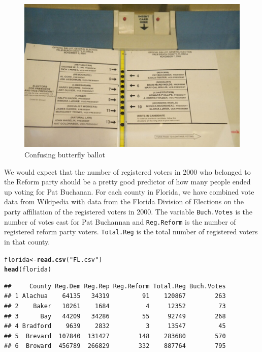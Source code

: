 \documentclass{article}\usepackage[]{graphicx}\usepackage[]{color}
\makeatletter
\newcommand{\hlstr}[1]{\textcolor[rgb]{0.192,0.494,0.8}{#1}}%
\newcommand{\hlstd}[1]{\textcolor[rgb]{0.345,0.345,0.345}{#1}}%
\newcommand{\hlkwb}[1]{\textcolor[rgb]{0.69,0.353,0.396}{#1}}%
\newcommand{\hlkwd}[1]{\textcolor[rgb]{0.737,0.353,0.396}{\textbf{#1}}}%
\newenvironment{kframe}{%
 \def\at@end@of@kframe{}%
 \ifinner\ifhmode%
  \def\at@end@of@kframe{\end{minipage}}%
  \begin{minipage}{\columnwidth}%
 \fi\fi%
 \def\FrameCommand##1{\hskip\@totalleftmargin \hskip-\fboxsep
 \colorbox{shadecolor}{##1}\hskip-\fboxsep
     \hskip-\linewidth \hskip-\@totalleftmargin \hskip\columnwidth}%
 \MakeFramed {\advance\hsize-\width
   \@totalleftmargin\z@ \linewidth\hsize
   \@setminipage}}%
 {\par\unskip\endMakeFramed%
 \at@end@of@kframe}
\newenvironment{knitrout}{}{} %
\makeatother
\begin{document}
\begin{figure}[h]
\centering
\includegraphics[scale = .3]{butterfly}
\caption{Confusing butterfly ballot}
\end{figure}

\FloatBarrier

We would expect that the number of registered voters in 2000 who belonged to the Reform party should be a pretty good predictor of how many people ended up voting for Pat Buchanan. For each county in Florida, we have combined vote data from Wikipedia with data from the Florida Division of Elections on the party affiliation of the registered voters in 2000. The variable \texttt{Buch.Votes} is the number of votes cast for Pat Buchannan and \texttt{Reg.Reform} is the number of registered reform party voters. \texttt{Total.Reg} is the total number of registered voters in that county. 

\begin{knitrout}
\color{fgcolor}\begin{kframe}
\begin{alltt}
\hlstd{florida} \hlkwb{<-} \hlkwd{read.csv}\hlstd{(}\hlstr{"FL.csv"}\hlstd{)}
\hlkwd{head}\hlstd{(florida)}
\end{alltt}
\begin{verbatim}
##     County Reg.Dem Reg.Rep Reg.Reform Total.Reg Buch.Votes
## 1 Alachua    64135   34319         91    120867        263
## 2    Baker   10261    1684          4     12352         73
## 3      Bay   44209   34286         55     92749        268
## 4 Bradford    9639    2832          3     13547         45
## 5  Brevard  107840  131427        148    283680        570
## 6  Broward  456789  266829        332    887764        795
\end{verbatim}
\end{kframe}
\end{knitrout}
\end{document}
